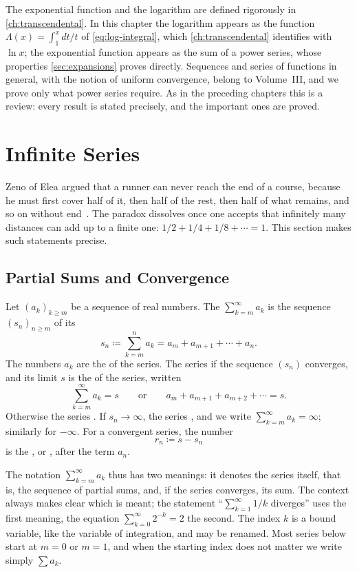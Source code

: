 The exponential function and the logarithm are defined rigorously in \cref{ch:transcendental}. In this chapter the logarithm appears as the function $\Lambda(x)=\int_1^xdt/t$ of \eqref{eq:log-integral}, which \cref{ch:transcendental} identifies with $\ln x$; the exponential function appears as the sum of a power series, whose properties \cref{sec:expansions} proves directly. Sequences and series of functions in general, with the notion of uniform convergence, belong to Volume~III, and we prove only what power series require. As in the preceding chapters this is a review: every result is stated precisely, and the important ones are proved.

\section{Infinite Series}
\label{sec:series}

Zeno of Elea argued that a runner can never reach the end of a course, because he must first cover half of it, then half of the rest, then half of what remains, and so on without end~\cite{boyer1959}. The paradox dissolves once one accepts that infinitely many distances can add up to a finite one: $1/2+1/4+1/8+\cdots=1$. This section makes such statements precise.

\subsection{Partial Sums and Convergence}

\begin{definition}[Series]
\label{def:series}
Let $(a_k)_{k\ge m}$ be a sequence of real numbers. The  $\sum_{k=m}^\infty a_k$ is the sequence $(s_n)_{n\ge m}$ of its 
\[
s_n\coloneqq\sum_{k=m}^na_k=a_m+a_{m+1}+\cdots+a_n .
\]
The numbers $a_k$ are the  of the series. The series  if the sequence $(s_n)$ converges, and its limit $s$ is the  of the series, written
\[
\sum_{k=m}^\infty a_k=s\qquad\text{or}\qquad a_m+a_{m+1}+a_{m+2}+\cdots=s .
\]
Otherwise the series . If $s_n\to\infty$, the series , and we write $\sum_{k=m}^\infty a_k=\infty$; similarly for $-\infty$. For a convergent series, the number
\[
r_n\coloneqq s-s_n
\]
is the , or , after the term $a_n$.
\end{definition}

The notation $\sum_{k=m}^\infty a_k$ thus has two meanings: it denotes the series itself, that is, the sequence of partial sums, and, if the series converges, its sum. The context always makes clear which is meant; the statement ``$\sum_{k=1}^\infty1/k$ diverges'' uses the first meaning, the equation $\sum_{k=0}^\infty2^{-k}=2$ the second. The index $k$ is a bound variable, like the variable of integration, and may be renamed. Most series below start at $m=0$ or $m=1$, and when the starting index does not matter we write simply $\sum a_k$.

